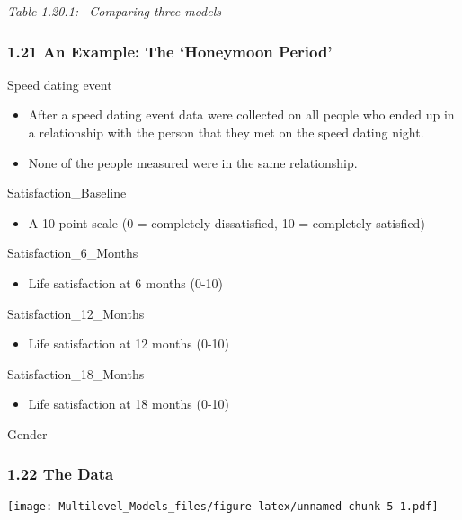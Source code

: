 \documentclass[
]{article}
\providecommand{\tightlist}{%
  \setlength{\itemsep}{0pt}\setlength{\parskip}{0pt}}
\begin{document}
\emph{Table 1.20.1: ~Comparing three models}

\hypertarget{an-example-the-honeymoon-period}{%
\subsubsection{1.21 An Example: The `Honeymoon
Period'}\label{an-example-the-honeymoon-period}}

Speed dating event

\begin{itemize}
\tightlist
\item
  After a speed dating event data were collected on all people who ended
  up in a relationship with the person that they met on the speed dating
  night.
\item
  None of the people measured were in the same relationship.
\end{itemize}

Satisfaction\_Baseline

\begin{itemize}
\tightlist
\item
  A 10-point scale (0 = completely dissatisfied, 10 = completely
  satisfied)
\end{itemize}

Satisfaction\_6\_Months

\begin{itemize}
\tightlist
\item
  Life satisfaction at 6 months (0-10)
\end{itemize}

Satisfaction\_12\_Months

\begin{itemize}
\tightlist
\item
  Life satisfaction at 12 months (0-10)
\end{itemize}

Satisfaction\_18\_Months

\begin{itemize}
\tightlist
\item
  Life satisfaction at 18 months (0-10)
\end{itemize}

Gender

\hypertarget{the-data}{%
\subsubsection{1.22 The Data}\label{the-data}}

\texttt{[image: Multilevel\_Models\_files/figure-latex/unnamed-chunk-5-1.pdf]}
\end{document}

